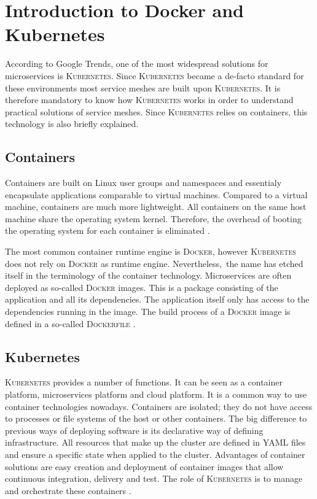 \section{Introduction to Docker and Kubernetes}

According to Google Trends, one of the most widespread solutions for microservices is \textsc{Kubernetes}.
Since \textsc{Kubernetes} became a de-facto standard for these environments most service meshes are built upon \textsc{Kubernetes}. It is therefore mandatory to know how \textsc{Kubernetes} works in order to understand practical solutions of service meshes. Since \textsc{Kubernetes} relies on containers, this technology is also briefly explained.

\subsection{Containers}

Containers are built on Linux user groups and namespaces and essentialy encapsulate applications comparable to virtual machines. Compared to a virtual machine, containers are much more lightweight. All containers on the same host machine share the operating system kernel. Therefore, the overhead of booting the operating system for each container is eliminated \cite[p. 220 ff.]{sm3}.

The most common container runtime engine is \textsc{Docker}, however \textsc{Kubernetes} does not rely on \textsc{Docker} as runtime engine. Nevertheless, the name has etched itself in the terminology of the container technology. Microservices are often deployed as so-called \textsc{Docker} images. This is a package consisting of the application and all its dependencies. The application itself only has access to the dependencies running in the image. The build process of a \textsc{Docker} image is defined in a so-called \textsc{Dockerfile} \cite[p. 224]{sm3}.

\subsection{Kubernetes}

\textsc{Kubernetes} provides a number of functions. It can be seen as a container platform, microservices platform and cloud platform.
It is a common way to use container technologies nowadays. Containers are isolated; they do not have access to processes or file systems of the host or other containers. The big difference to previous ways of deploying software is its declarative way of defining infrastructure. All resources that make up the cluster are defined in YAML files and ensure a specific state when applied to the cluster.
Advantages of container solutions are easy creation and deployment of container images that allow continuous integration, delivery and test. The role of \textsc{Kubernetes} is to manage and orchestrate these containers \cite{k8s}.

